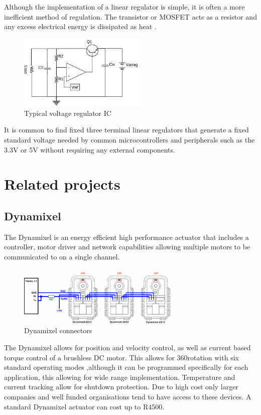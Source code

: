 Although the implementation of a linear regulator is simple, it is often a more inefficient method of regulation. The transistor or MOSFET acts as a resistor and any excess electrical energy is dissipated as heat\cite{linear_regulator}
\vspace{-4mm}.
\begin{figure}[H]
    \centering
    \includegraphics[width=0.55\textwidth]{Linear_Voltage_Regulator.jpg}
    \caption{Typical voltage regulator IC}
    \label{RESDIV}
\end{figure}
\vspace{-8mm}
It is common to find fixed three terminal linear regulators that generate a fixed standard voltage needed by common microcontrollers and peripherals such as the 3.3V or 5V without requiring any external components.

\newpage
\section{Related projects}
\subsection{Dynamixel}
The Dynamixel is an energy efficient high performance actuator that includes a controller, motor driver and network capabilities allowing multiple motors to be communicated to on a single channel.
\begin{figure}[H]
\centering
\includegraphics[width=0.7\textwidth]{Dynamixel.png}
\caption{Dynamixel connectors \cite{Dynamixel}}
\end{figure}

The Dynamixel allows for position and velocity control, as well as current based torque control of a brushless DC motor.  This allows for 360\degree  rotation with six standard operating modes ,although it can be programmed specifically for each application, this allowing for wide range implementation. Temperature and current tracking allow for shutdown protection. Due to high cost only larger companies and well funded organisations tend to have access to these devices. A standard Dynamixel actuator can cost up to R4500.\newline
 
